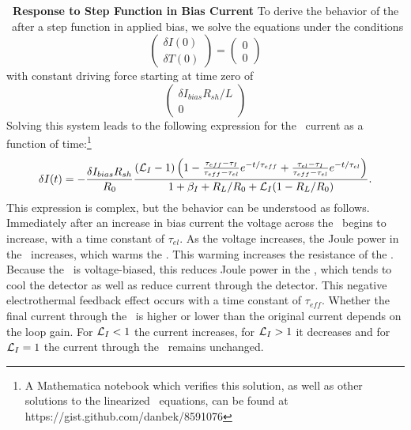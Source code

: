 \textbf{\TES\ Response to Step Function in Bias Current}
To derive the behavior of the \TES\ after a step function in applied bias, we solve the equations under the conditions
\begin{equation}
\begin{pmatrix} \delta I(0) \\ \delta T(0) \end{pmatrix} = \begin{pmatrix} 0 \\ 0 \end{pmatrix}
\end{equation}
with constant driving force starting at time zero of
\begin{equation}
\begin{pmatrix} \delta I_{bias} R_{sh} / L \\ 0 \end{pmatrix}
\end{equation}
Solving this system leads to the following expression for the \TES\ current as a function of time:\footnote{A Mathematica notebook which verifies this solution, as well as other solutions to the linearized \TES\ equations, can be found at https://gist.github.com/danbek/8591076}
\begin{equation}\label{eqn:bias-step-resp}
\delta I (t)
   = - \frac{\delta I_{bias} R_{sh}}{R_0} 
       \frac{(\mathcal{L}_I - 1)
             \left(1 - \frac{\tau_{eff} - \tau_I}{\tau_{eff} - \tau_{el}} e^{-t/\tau_{eff}}
                 	       + \frac{\tau_{el} - \tau_I}{\tau_{eff} - \tau_{el}} e^{-t/\tau_{el}} \right)}
            {1 + \beta_I + R_L/R_0 + \mathcal{L}_I(1 - R_L/R_0)}
       .
\end{equation}
This expression is complex, but the behavior can be understood as follows.
Immediately after an increase in bias current the voltage across the \TES\ begins to increase, with a time constant of $\tau_{el}$.
As the voltage increases, the Joule power in the \TES\ increases, which warms the \TES.
This warming increases the resistance of the \TES.
Because the \TES\ is voltage-biased, this reduces Joule power in the \TES, which tends to cool the detector as well as reduce current through the detector.
This negative electrothermal feedback effect occurs with a time constant of $\tau_{eff}$.
Whether the final current through the \TES\ is higher or lower than the original current depends on the loop gain.
For $\mathcal{L}_I < 1$ the current increases, for $\mathcal{L}_I > 1$ it decreases and for $\mathcal{L}_I = 1$ the current through the \TES\ remains unchanged.

